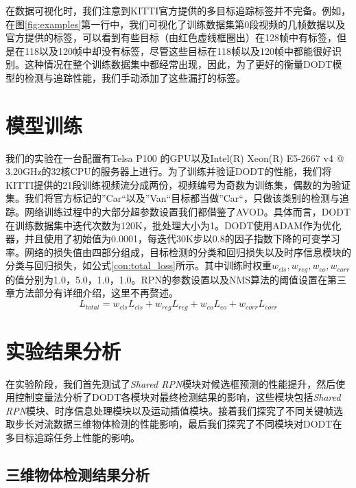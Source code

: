 

在数据可视化时，我们注意到KITTI官方提供的多目标追踪标签并不完备。例如，在图\ref{fig:examples}第一行中，我们可视化了训练数据集第0段视频的几帧数据以及官方提供的标签，可以看到有些目标（由红色虚线框圈出）在128帧中有标签，但是在118以及120帧中却没有标签，尽管这些目标在118帧以及120帧中都能很好识别。这种情况在整个训练数据集中都经常出现，因此，为了更好的衡量DODT模型的检测与追踪性能，我们手动添加了这些漏打的标签。

\section{模型训练}
\label{training}
我们的实验在一台配置有Telsa P100 的GPU以及Intel(R) Xeon(R) E5-2667 v4 @ 3.20GHz的32核CPU的服务器上进行。为了训练并验证DODT的性能，我们将KITTI提供的21段训练视频流分成两份，视频编号为奇数为训练集，偶数的为验证集。我们将官方标记的”Car“以及”Van“目标都当做”Car“，只做该类别的检测与追踪。网络训练过程中的大部分超参数设置我们都借鉴了AVOD\cite{ku2018joint}。具体而言，DODT在训练数据集中迭代次数为120K，批处理大小为1。DODT使用ADAM\cite{kingma2014adam}作为优化器，并且使用了初始值为0.0001，每迭代30K步以0.8的因子指数下降的可变学习率。网络的损失值由四部分组成，目标检测的分类和回归损失以及时序信息模块的分类与回归损失，如公式\ref{con:total_loss}所示。其中训练时权重$w_{cls}, w_{reg}, w_{co}, w_{corr}$的值分别为1.0，5.0，1.0，1.0。RPN的参数设置以及NMS算法的阈值设置在第三章方法部分有详细介绍，这里不再赘述。
\begin{equation}
L_{total} = w_{cls}L_{cls} + w_{reg}L_{reg} + w_{co}L_{co} + w_{corr}L_{corr}
\label{con:total_loss}
\end{equation}

\section{实验结果分析}
\label{results}

在实验阶段，我们首先测试了\textit{Shared RPN}模块对候选框预测的性能提升，然后使用控制变量法分析了DODT各模块对最终检测结果的影响，这些模块包括\textit{Shared RPN}模块、时序信息处理模块以及运动插值模块。接着我们探究了不同关键帧选取步长对流数据三维物体检测的性能影响，最后我们探究了不同模块对DODT在多目标追踪任务上性能的影响。

\subsection{三维物体检测结果分析}
\label{ablation_study}


